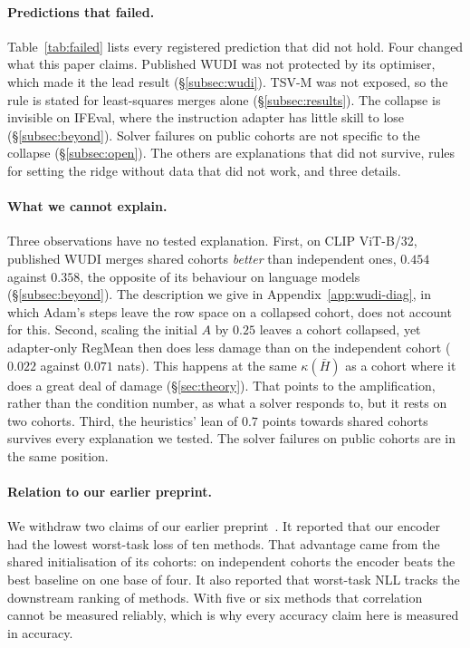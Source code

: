 \paragraph{Predictions that failed.} Table~\ref{tab:failed} lists every
registered prediction that did not hold. Four changed what this paper claims.
Published WUDI was not protected by its optimiser, which made it the lead
result (\S\ref{subsec:wudi}). TSV-M was not exposed, so the rule is stated
for least-squares merges alone (\S\ref{subsec:results}). The collapse is
invisible on IFEval, where the instruction adapter has little skill to lose
(\S\ref{subsec:beyond}). Solver failures on public cohorts are not specific
to the collapse (\S\ref{subsec:open}). The others are explanations that did
not survive, rules for setting the ridge without data that did not work, and
three details.

\paragraph{What we cannot explain.} Three observations have no tested
explanation. First, on CLIP ViT-B/32, published WUDI merges shared cohorts
\emph{better} than independent ones, $0.454$ against $0.358$, the opposite of
its behaviour on language models (\S\ref{subsec:beyond}). The description we
give in Appendix~\ref{app:wudi-diag}, in which Adam's steps leave the row space on a
collapsed cohort, does not account for this. Second, scaling the initial $A$ by
$0.25$ leaves a cohort collapsed, yet adapter-only RegMean then does less
damage than on the independent cohort ($0.022$ against $0.071$ nats). This happens
at the same $\kappa(\bar H)$ as a cohort where it does a great deal of damage
(\S\ref{sec:theory}). That points to the amplification, rather than the
condition number, as what a solver responds to, but it rests on two cohorts.
Third, the heuristics' lean of $0.7$ points towards shared cohorts survives
every explanation we tested. The solver failures on public cohorts are in the
same position.

\paragraph{Relation to our earlier preprint.} We withdraw two
claims of our earlier preprint~\citep{pathak2026rd}. It reported that our
encoder had the lowest worst-task loss of ten methods. That advantage came
from the shared initialisation of its cohorts: on independent cohorts the
encoder beats the best baseline on one base of four. It also reported that
worst-task NLL tracks the downstream ranking of methods. With five or six
methods that correlation cannot be measured reliably, which is why every
accuracy claim here is measured in accuracy.

